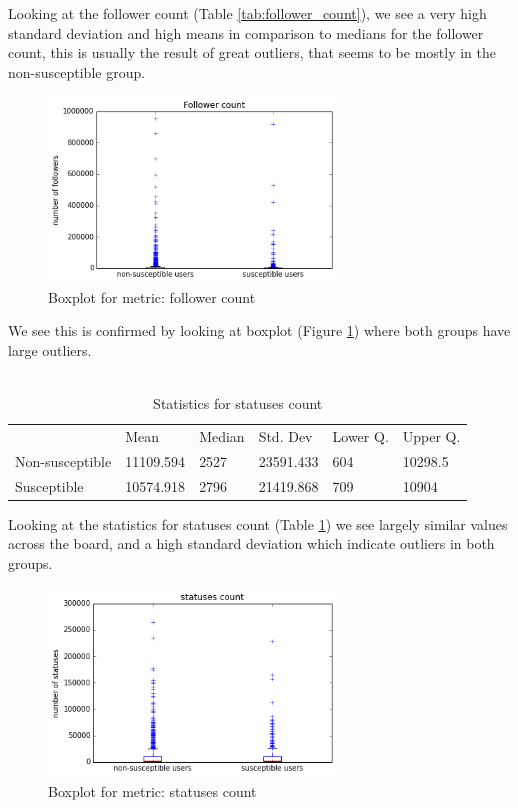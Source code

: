 \documentclass[10pt]{IEEEtran}
\begin{document}
Looking at the follower count (Table \ref{tab:follower_count}), we see a very high standard deviation and high means in comparison to medians for the follower count, this is usually the result of great outliers, that seems to be mostly in the non-susceptible group.
\begin{figure}[H]
  \centering
  \includegraphics[width=3.0in]{follower_boxplot}
  \caption{Boxplot for metric: follower count}
  \label{fig:follower_boxplot}
\end{figure}
We see this is confirmed by looking at boxplot (Figure \ref{fig:follower_boxplot}) where both groups have large outliers.\\\\
\begin{table}[H]


\begin{tabular}{llllll}
\textbf{}       & Mean      & Median & Std. Dev  & Lower Q. & Upper Q. \\
Non-susceptible & 11109.594 & 2527   & 23591.433 &  604  & 10298.5     \\
Susceptible     & 10574.918 & 2796   & 21419.868 & 709    &   10904    
\end{tabular}
\caption{Statistics for statuses count}
\label{tab:statuses_count}
\end{table}
Looking at the statistics for statuses count (Table \ref{tab:statuses_count}) we see largely similar values across the board, and a high standard deviation which indicate outliers in both groups.
\begin{figure}[H]
  \centering
  \includegraphics[width=3.0in]{statuses_count_boxplot}
  \caption{Boxplot for metric: statuses count}
  \label{fig:statuses_boxplot}
\end{figure}
\end{document}
